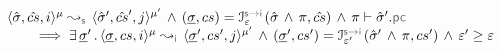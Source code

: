 \begin{lemma}\label{soundiness:control:flow:cmds}
$$
\begin{array}{l} 
\abssemrule{\sstate, \scs, i}{\sstate', \scs', j}{\mode}{\mode'}{\symbolic} 
     \, \wedge \, (\istate, \cs) = \interpret{\symbinst}{\senv}(\sstate \, \wedge \, \pc, \scs)
     \, \wedge \, \pc \vdash \sstate'.\pcsel  \\ \quad \quad
     \implies 
        \exists \, \istate' \, . \, \abssemrule{\istate, \cs, i}{\istate', \cs', j}{\mode}{\mode'}{\instrumented}
         \, \wedge \, 
            (\istate', \cs') = \interpret{\symbinst}{\senv'}(\sstate' \, \wedge \, \pc, \cs')  \, \wedge \, 
            \senv' \fextends  \senv
 \end{array}
$$
\end{lemma}

